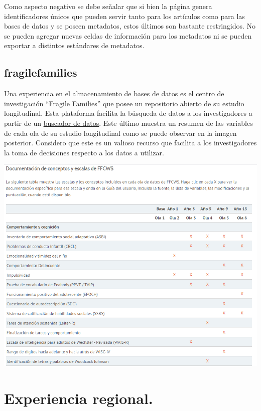 \documentclass[
  14pt,
]{book}
\let\origfigure\figure
\let\endorigfigure\endfigure
\renewenvironment{figure}[1][2] {
  \expandafter\origfigure\expandafter[H]
} {
  \endorigfigure
}
\begin{document}
Como aspecto negativo se debe señalar que si bien la página genera identificadores únicos que pueden servir tanto para los artículos como para las bases de datos y se poseen metadatos, estos últimos son bastante restringidos. No se pueden agregar nuevas celdas de información para los metadatos ni se pueden exportar a distintos estándares de metadatos.

\hypertarget{fragilefamilies}{%
\subsection{fragilefamilies}\label{fragilefamilies}}

Una experiencia en el almacenamiento de bases de datos es el centro de investigación ``Fragile Families'' que posee un repositorio abierto de su estudio longitudinal. Esta plataforma facilita la búsqueda de datos a los investigadores a partir de un \href{https://fragilefamilies.princeton.edu/data-and-documentation/metadata-explorer}{buscador de datos}. Este último muestra un resumen de las variables de cada ola de su estudio longitudinal como se puede observar en la imagen posterior. Considero que este es un valioso recurso que facilita a los investigadores la toma de decisiones respecto a los datos a utilizar.

\begin{figure}[!ht]

{\centering \includegraphics[width=0.8\linewidth,]{reslong} 

}

\caption{Tolerar ideas distintas es el valor más importante que debieran aprender}\label{fig:unnamed-chunk-25}
\end{figure}

\hypertarget{experiencia-regional.}{%
\section{Experiencia regional.}\label{experiencia-regional.}}
\end{document}
